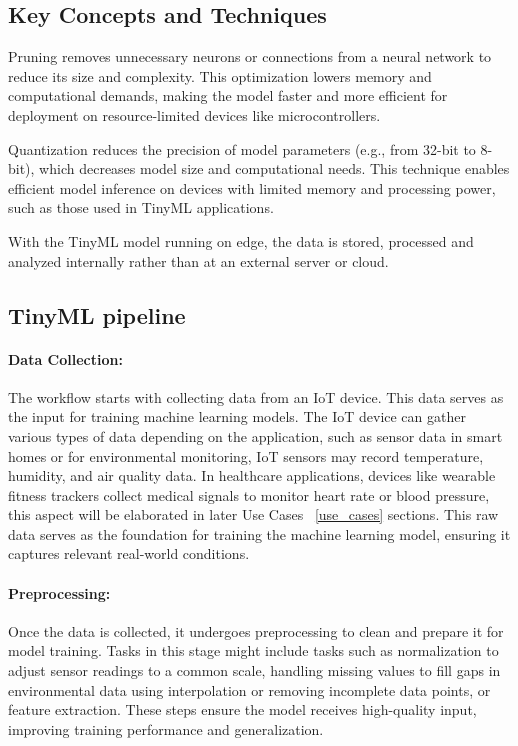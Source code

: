 \documentclass[twocolumn]{article}
\begin{document}
\subsection{Key Concepts and Techniques}

Pruning removes unnecessary neurons or connections from a neural network to reduce its size and complexity. This optimization lowers memory and computational demands, making the model faster and more efficient for deployment on resource-limited devices like microcontrollers.

Quantization reduces the precision of model parameters (e.g., from 32-bit to 8-bit), which decreases model size and computational needs. This technique enables efficient model inference on devices with limited memory and processing power, such as those used in TinyML applications.

With the TinyML model running on edge, the data is stored, processed and analyzed internally rather
than at an external server or cloud. 

\subsection{TinyML pipeline}



\paragraph{Data Collection:}
	The workflow starts with collecting data from an IoT device. This data serves as the input for training machine learning models. The IoT device can gather various types of data depending on the application, such as sensor data in smart homes or for environmental monitoring, IoT sensors may record temperature, humidity, and air quality data. In healthcare applications, devices like wearable fitness trackers collect medical signals to monitor heart rate or blood pressure, this aspect will be elaborated in later Use Cases ~\ref{use_cases} sections. This raw data serves as the foundation for training the machine learning model, ensuring it captures relevant real-world conditions. \\[0.10cm]

\paragraph{Preprocessing:}
	Once the data is collected, it undergoes preprocessing to clean and prepare it for model training. Tasks in this stage might include tasks such as normalization to adjust sensor readings to a common scale, handling missing values to fill gaps in environmental data using interpolation or removing incomplete data points, or feature extraction. These steps ensure the model receives high-quality input, improving training performance and generalization.\\[0.10cm]
\end{document}
